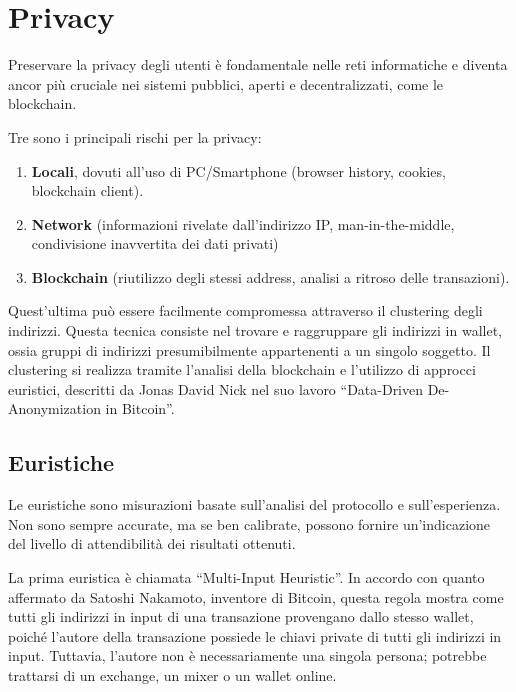 \chapter{Privacy}
\newtheorem{definition}{Definition}
Preservare la privacy degli utenti è fondamentale nelle reti informatiche e diventa ancor più cruciale nei sistemi pubblici, aperti e decentralizzati, come le blockchain. 

Tre sono i principali rischi per la privacy:
\begin{enumerate}
    \item \textbf{Locali}, dovuti all'uso di PC/Smartphone (browser history, cookies, blockchain client).
    \item \textbf{Network} (informazioni rivelate dall'indirizzo IP, man-in-the-middle, condivisione inavvertita dei dati privati)
    \item \textbf{Blockchain} (riutilizzo degli stessi address, analisi a ritroso delle transazioni).
\end{enumerate}

Quest'ultima può essere facilmente compromessa attraverso il clustering degli indirizzi. Questa tecnica consiste nel trovare e raggruppare gli indirizzi in wallet, ossia gruppi di indirizzi presumibilmente appartenenti a un singolo soggetto. Il clustering si realizza tramite l'analisi della blockchain e l'utilizzo di approcci euristici, descritti da Jonas David Nick nel suo lavoro “Data-Driven De-Anonymization in Bitcoin”.

\section{Euristiche}
Le euristiche sono misurazioni basate sull'analisi del protocollo e sull'esperienza. Non sono sempre accurate, ma se ben calibrate, possono fornire un'indicazione del livello di attendibilità dei risultati ottenuti. 

La prima euristica è chiamata “Multi-Input Heuristic”. In accordo con quanto affermato da Satoshi Nakamoto, inventore di Bitcoin, questa regola mostra come tutti gli indirizzi in input di una transazione provengano dallo stesso wallet, poiché l'autore della transazione possiede le chiavi private di tutti gli indirizzi in input. Tuttavia, l'autore non è necessariamente una singola persona; potrebbe trattarsi di un exchange, un mixer o un wallet online. 

